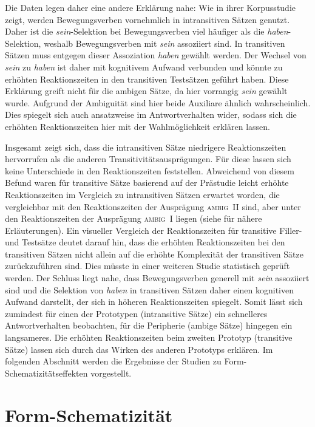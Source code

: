 Die Daten legen daher eine andere Erklärung nahe: Wie \textcite[267--268]{Gillmann.2016} in ihrer Korpusstudie zeigt, werden Bewegungsverben vornehmlich in intransitiven Sätzen genutzt. Daher ist die \textit{sein}-Selektion bei Bewegungsverben viel häufiger als die \textit{haben}-Selektion, weshalb Bewegungsverben mit \textit{sein} assoziiert sind. In transitiven Sätzen muss entgegen dieser Assoziation \textit{haben} gewählt werden. Der Wechsel von \textit{sein} zu \textit{haben} ist daher mit kogni\-tivem Aufwand verbunden und könnte zu erhöhten Reaktionszeiten in den transitiven Testsätzen geführt haben. Diese Erklärung greift nicht für die ambigen Sätze, da hier vorrangig \textit{sein} gewählt wurde. Aufgrund der Ambiguität sind hier beide Auxiliare ähnlich wahrscheinlich. Dies spiegelt sich auch ansatzweise im Antwortverhalten wider, sodass sich die erhöhten Reaktionszeiten hier mit der Wahlmöglichkeit erklären lassen.  

Insgesamt zeigt sich, dass die intransitiven Sätze niedrigere Reaktionszeiten hervorrufen als die anderen Transitivitätsausprägungen. Für diese lassen sich keine Unterschiede in den Reaktionszeiten feststellen. Abweichend von diesem Befund waren für transitive Sätze basierend auf der Prästudie leicht erhöhte Reaktionszeiten im Vergleich zu intransitiven Sätzen erwartet worden, die vergleichbar mit den Reaktionszeiten der Ausprägung \textsc{ambig~II} sind, aber unter den Reaktionszeiten der Ausprägung \textsc{ambig~I} liegen (siehe  für nähere Erläuterungen). Ein visueller Vergleich der Reaktionszeiten für transitive Filler- und Testsätze deutet darauf hin, dass die erhöhten Reaktionszeiten bei den transitiven Sätzen nicht allein auf die erhöhte Komplexität der transitiven Sätze zurückzuführen sind. Dies müsste in einer wei\-teren Studie statistisch geprüft werden. Der Schluss liegt nahe, dass Bewegungsverben generell mit \textit{sein} assoziiert sind und die Selektion von \textit{haben} in transitiven Sätzen daher einen kognitiven Aufwand darstellt, der sich in höheren Reaktionszeiten spiegelt. Somit lässt sich zumindest für einen der Prototypen (intransitive Sätze) ein schnelleres Antwortverhalten beobachten, für die Peripherie (ambige Sätze) hingegen ein langsameres. Die erhöhten Reaktionszeiten beim zweiten Prototyp (transitive Sätze) lassen sich durch das Wirken des anderen Prototyps erklären. 
Im folgenden Abschnitt werden die Ergebnisse der Studien zu Form-Schematizitätseffekten vorgestellt.

\section{Form-Schematizität}
\label{ergschema}

